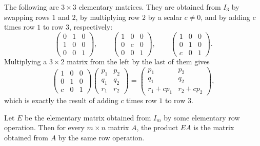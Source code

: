 \begin{example}
    The following are $3 \times 3$ elementary matrices. They are obtained from $I_3$ by swapping rows $1$ and $2$, by multiplying row $2$ by a scalar $c \neq 0$, and by adding $c$ times row $1$ to row $3$, respectively:
    \[\begin{pmatrix}
        0 & 1 & 0 \\
        1 & 0 & 0 \\
        0 & 0 & 1
    \end{pmatrix}, \qquad \begin{pmatrix}
        1 & 0 & 0 \\
        0 & c & 0 \\
        0 & 0 & 1
    \end{pmatrix}, \qquad \begin{pmatrix}
        1 & 0 & 0 \\
        0 & 1 & 0 \\
        c & 0 & 1
    \end{pmatrix}.\]
    Multiplying a $3 \times 2$ matrix from the left by the last of them gives
    \[\begin{pmatrix}
        1 & 0 & 0 \\
        0 & 1 & 0 \\
        c & 0 & 1
    \end{pmatrix} \begin{pmatrix}
        p_1 & p_2 \\
        q_1 & q_2 \\
        r_1 & r_2
    \end{pmatrix} = \begin{pmatrix}
        p_1 & p_2 \\
        q_1 & q_2 \\
        r_1 + c p_1 & r_2 + c p_2
    \end{pmatrix},\]
    which is exactly the result of adding $c$ times row $1$ to row $3$.
\end{example}

\begin{lemma}\label{L1-lem:elementary}
    Let $E$ be the elementary matrix obtained from $I_m$ by some elementary row operation. Then for every $m \times n$ matrix $A$, the product $EA$ is the matrix obtained from $A$ by the same row operation.
\end{lemma}

